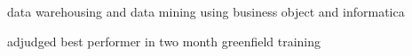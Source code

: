\begin{minipage}[t]{0.675\textwidth}

\begin{tightitemize}
\item data warehousing and data mining using business object and informatica
\item adjudged best performer in two month greenfield training 
\end{tightitemize}


\end{minipage} %
\vspace*{\fill}
\center{\textcolor{gray}{2/2}}